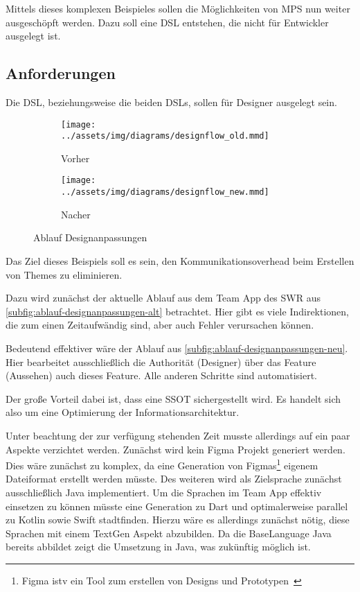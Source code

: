 Mittels dieses komplexen Beispieles sollen die Möglichkeiten von \ac{MPS} nun weiter ausgeschöpft werden.
Dazu soll eine \ac{DSL} entstehen, die nicht für Entwickler ausgelegt ist.

\subsection{Anforderungen}\label{subsec:anforderungen}
Die \ac{DSL}, beziehungsweise die beiden \acp{DSL}, sollen für Designer ausgelegt sein.
\begin{figure}[ht]
    \begin{subfigure}[c]{0.5\textwidth}
        \begin{center}
            \texttt{[image: ../assets/img/diagrams/designflow\_old.mmd]}
        \end{center}
        \caption{Vorher}
        \label{subfig:ablauf-designanpassungen-alt}
    \end{subfigure}
    \begin{subfigure}[c]{0.5\textwidth}
        \begin{center}
            \texttt{[image: ../assets/img/diagrams/designflow\_new.mmd]}
        \end{center}
        \caption{Nacher}
        \label{subfig:ablauf-designanpassungen-neu}
    \end{subfigure}
    \caption{Ablauf Designanpassungen}
    \label{fig:ablauf-designanpassungen}
\end{figure}
Das Ziel dieses Beispiels soll es sein, den Kommunikationsoverhead beim Erstellen von Themes zu eliminieren.

Dazu wird zunächst der aktuelle Ablauf aus dem Team App des \ac{SWR} aus \autoref{subfig:ablauf-designanpassungen-alt} betrachtet.
Hier gibt es viele Indirektionen, die zum einen Zeitaufwändig sind, aber auch Fehler verursachen können.

Bedeutend effektiver wäre der Ablauf aus \autoref{subfig:ablauf-designanpassungen-neu}.
Hier bearbeitet ausschließlich die Authorität (Designer) über das Feature (Aussehen) auch dieses Feature.
Alle anderen Schritte sind automatisiert.

Der große Vorteil dabei ist, dass eine \ac{SSOT} sichergestellt wird.
Es handelt sich also um eine Optimierung der Informationsarchitektur.

Unter beachtung der zur verfügung stehenden Zeit musste allerdings auf ein paar Aspekte verzichtet werden.
Zunächst wird kein Figma Projekt generiert werden.
Dies wäre zunächst zu komplex, da eine Generation von Figmas\footnote{Figma istv ein Tool zum erstellen von Designs und Prototypen~\autocite{figma-inc-no-date}} eigenem Dateiformat erstellt werden müsste.
Des weiteren wird als Zielsprache zunächst ausschließlich Java implementiert.
Um die Sprachen im Team App effektiv einsetzen zu können müsste eine Generation zu Dart und optimalerweise parallel zu Kotlin sowie Swift stadtfinden.
Hierzu wäre es allerdings zunächst nötig, diese Sprachen mit einem TextGen Aspekt abzubilden.
Da die BaseLanguage Java bereits abbildet zeigt die Umsetzung in Java, was zukünftig möglich ist.

